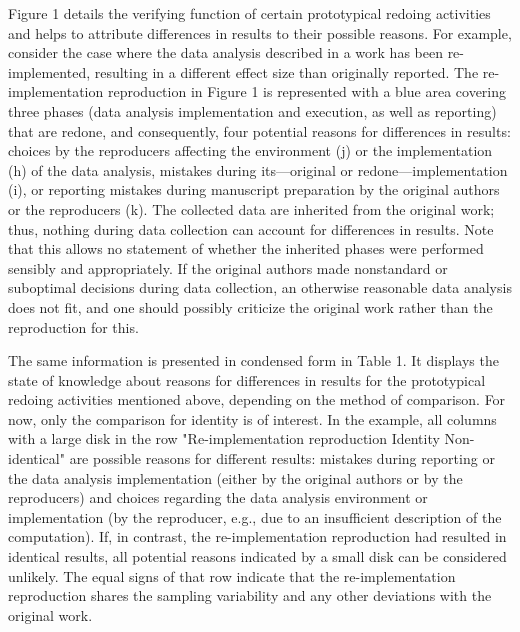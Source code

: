 \documentclass[authordate, meta]{jote-new-article}
\begin{document}
	Figure 1 details the verifying function of certain prototypical redoing activities and helps to attribute differences in results to their possible reasons. For example, consider the case where the data analysis described in a work has been re-implemented, resulting in a different effect size than originally reported. The re-implementation reproduction in Figure 1 is represented with a blue area covering three phases (data analysis implementation and execution, as well as reporting) that are redone, and consequently, four potential reasons for differences in results: choices by the reproducers affecting the environment (j) or the implementation (h) of the data analysis, mistakes during its—original or redone—implementation (i), or reporting mistakes during manuscript preparation by the original authors or the reproducers (k). The collected data are inherited from the original work; thus, nothing during data collection can account for differences in results. Note that this allows no statement of whether the inherited phases were performed sensibly and appropriately. If the original authors made nonstandard or suboptimal decisions during data collection, an otherwise reasonable data analysis does not fit, and one should possibly criticize the original work rather than the reproduction for this.



	The same information is presented in condensed form in Table 1. It displays the state of knowledge about reasons for differences in results for the prototypical redoing activities mentioned above, depending on the method of comparison. For now, only the comparison for identity is of interest. In the example, all columns with a large disk in the row "Re-implementation reproduction \rightarrow{ }Identity \rightarrow{ }Non-identical" are possible reasons for different results: mistakes during reporting or the data analysis implementation (either by the original authors or by the reproducers) and choices regarding the data analysis environment or implementation (by the reproducer, e.g., due to an insufficient description of the computation). If, in contrast, the re-implementation reproduction had resulted in identical results, all potential reasons indicated by a small disk can be considered unlikely. The equal signs of that row indicate that the re-implementation reproduction shares the sampling variability and any other deviations with the original work.


	

	
\end{document}
